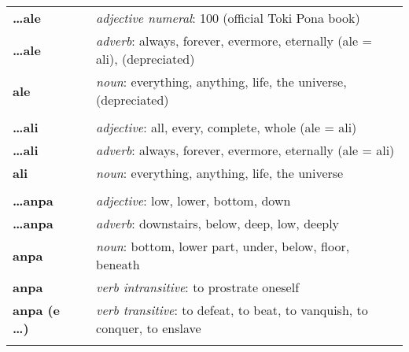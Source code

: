 \begin{supertabular}{p{2,5cm}|ll}
    \textbf{\dots ale}           &  & \textit{adjective numeral}: 100 (official Toki Pona book)                                                  \\
    \textbf{\dots ale}           &  & \textit{adverb}: always, forever, evermore, eternally (ale = ali), (depreciated)                           \\
    \textbf{ale}                 &  & \textit{noun}: everything, anything, life, the universe, (depreciated)                                     \\
                                 &  &                                                                                                            \\ %
    \textbf{\dots ali}           &  & \textit{adjective}: all, every, complete, whole (ale = ali)                                                \\
    \textbf{\dots ali}           &  & \textit{adverb}: always, forever, evermore, eternally (ale = ali)                                          \\
    \textbf{ali}                 &  & \textit{noun}: everything, anything, life, the universe                                                    \\
                                 &  &                                                                                                            \\ %
    \textbf{\dots anpa}          &  & \textit{adjective}: low, lower, bottom, down                                                               \\
    \textbf{\dots anpa}          &  & \textit{adverb}: downstairs, below, deep, low, deeply                                                      \\
    \textbf{anpa}                &  & \textit{noun}: bottom, lower part, under, below, floor, beneath                                            \\
    \textbf{anpa}                &  & \textit{verb intransitive}: to prostrate oneself                                                           \\
    \textbf{anpa (e \dots)}      &  & \textit{verb transitive}: to defeat, to beat, to vanquish, to conquer, to enslave                          \\
                                 &  &                                                                                                            \\ %

\end{supertabular}
